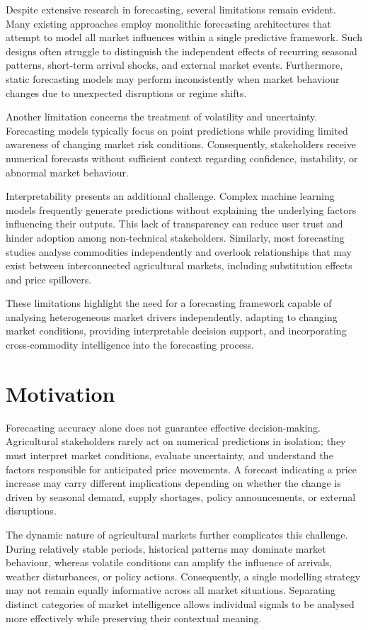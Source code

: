 \documentclass[12pt,a4paper]{report}
\theoremstyle{definition}
\theoremstyle{remark}
\begin{document}
Despite extensive research in forecasting, several limitations remain evident. Many existing approaches employ monolithic forecasting architectures that attempt to model all market influences within a single predictive framework. Such designs often struggle to distinguish the independent effects of recurring seasonal patterns, short-term arrival shocks, and external market events. Furthermore, static forecasting models may perform inconsistently when market behaviour changes due to unexpected disruptions or regime shifts.

Another limitation concerns the treatment of volatility and uncertainty. Forecasting models typically focus on point predictions while providing limited awareness of changing market risk conditions. Consequently, stakeholders receive numerical forecasts without sufficient context regarding confidence, instability, or abnormal market behaviour.

Interpretability presents an additional challenge. Complex machine learning models frequently generate predictions without explaining the underlying factors influencing their outputs. This lack of transparency can reduce user trust and hinder adoption among non-technical stakeholders. Similarly, most forecasting studies analyse commodities independently and overlook relationships that may exist between interconnected agricultural markets, including substitution effects and price spillovers.

These limitations highlight the need for a forecasting framework capable of analysing heterogeneous market drivers independently, adapting to changing market conditions, providing interpretable decision support, and incorporating cross-commodity intelligence into the forecasting process.

\section{Motivation}

Forecasting accuracy alone does not guarantee effective decision-making. Agricultural stakeholders rarely act on numerical predictions in isolation; they must interpret market conditions, evaluate uncertainty, and understand the factors responsible for anticipated price movements. A forecast indicating a price increase may carry different implications depending on whether the change is driven by seasonal demand, supply shortages, policy announcements, or external disruptions.

The dynamic nature of agricultural markets further complicates this challenge. During relatively stable periods, historical patterns may dominate market behaviour, whereas volatile conditions can amplify the influence of arrivals, weather disturbances, or policy actions. Consequently, a single modelling strategy may not remain equally informative across all market situations. Separating distinct categories of market intelligence allows individual signals to be analysed more effectively while preserving their contextual meaning.
\end{document}
